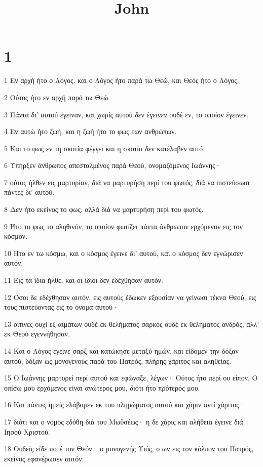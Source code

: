 

\title{John}


\chapter{1}

\par 1 Εν αρχή ήτο ο Λόγος, και ο Λόγος ήτο παρά τω Θεώ, και Θεός ήτο ο Λόγος.
\par 2 Ούτος ήτο εν αρχή παρά τω Θεώ.
\par 3 Πάντα δι' αυτού έγειναν, και χωρίς αυτού δεν έγεινεν ουδέ εν, το οποίον έγεινεν.
\par 4 Εν αυτώ ήτο ζωή, και η ζωή ήτο το φως των ανθρώπων.
\par 5 Και το φως εν τη σκοτία φέγγει και η σκοτία δεν κατέλαβεν αυτό.
\par 6 Υπήρξεν άνθρωπος απεσταλμένος παρά Θεού, ονομαζόμενος Ιωάννης·
\par 7 ούτος ήλθεν εις μαρτυρίαν, διά να μαρτυρήση περί του φωτός, διά να πιστεύσωσι πάντες δι' αυτού.
\par 8 Δεν ήτο εκείνος το φως, αλλά διά να μαρτυρήση περί του φωτός.
\par 9 Ήτο το φως το αληθινόν, το οποίον φωτίζει πάντα άνθρωπον ερχόμενον εις τον κόσμον.
\par 10 Ήτο εν τω κόσμω, και ο κόσμος έγεινε δι' αυτού, και ο κόσμος δεν εγνώρισεν αυτόν.
\par 11 Εις τα ίδια ήλθε, και οι ίδιοι δεν εδέχθησαν αυτόν.
\par 12 Όσοι δε εδέχθησαν αυτόν, εις αυτούς έδωκεν εξουσίαν να γείνωσι τέκνα Θεού, εις τους πιστεύοντας εις το όνομα αυτού·
\par 13 οίτινες ουχί εξ αιμάτων ουδέ εκ θελήματος σαρκός ουδέ εκ θελήματος ανδρός, αλλ' εκ Θεού εγεννήθησαν.
\par 14 Και ο Λόγος έγεινε σαρξ και κατώκησε μεταξύ ημών, και είδομεν την δόξαν αυτού, δόξαν ως μονογενούς παρά του Πατρός, πλήρης χάριτος και αληθείας.
\par 15 Ο Ιωάννης μαρτυρεί περί αυτού και εφώναξε, λέγων· Ούτος ήτο περί ου είπον, Ο οπίσω μου ερχόμενος είναι ανώτερος μου, διότι ήτο πρότερός μου.
\par 16 Και πάντες ημείς ελάβομεν εκ του πληρώματος αυτού και χάριν αντί χάριτος·
\par 17 διότι και ο νόμος εδόθη διά του Μωϋσέως· η δε χάρις και αλήθεια έγεινε διά Ιησού Χριστού.
\par 18 Ουδείς είδε ποτέ τον Θεόν· ο μονογενής Υιός, ο ων εις τον κόλπον του Πατρός, εκείνος εφανέρωσεν αυτόν.
